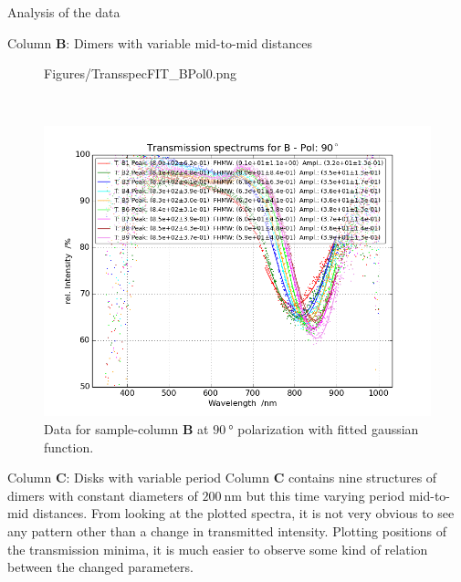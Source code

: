 \documentclass[pdftex, a4paper,11pt, twoside, UKenglish]{report}
\begin{document}
\begin{chapter}{Analysis of the data}
\begin{section}{Column \textbf{B}: Dimers with variable mid-to-mid
        distances}
\begin{figure}[ht!]
\begin{minipage}{.95\textwidth}
              {Figures/TransspecFIT_BPol0.png}
          \caption{Data for sample-column \textbf{B} at $\SI{0}{\degree}$
              polarization with fitted gaussian function.}
          \label{fig:TransspecFIT_BPol0}
        \end{minipage}\\
        \begin{minipage}{.95\textwidth}
          \centering
          \includegraphics[width=\textwidth]
              {Figures/TransspecFIT_BPol90.png}
          \caption{Data for sample-column \textbf{B} at $\SI{90}{\degree}$
              polarization with fitted gaussian function.}
          \label{fig:TransspecFIT_BPol90}
        \end{minipage}
      \end{figure}
      
    \end{section}
    
    
    
    \newpage
    \begin{section}{Column \textbf{C}: Disks with variable period}
      \label{chp:DataC}
      Column \textbf{C} contains nine structures of dimers with constant
      diameters of $\SI{200}{\nano\meter}$ but this time varying period
      mid-to-mid distances.
      From looking at the plotted spectra, it is not very obvious to see any
      pattern other than a change in transmitted intensity.
      Plotting positions of the transmission minima, it is much easier to
      observe some kind of relation between the changed parameters.


\end{section}
\end{chapter}
\end{document}

